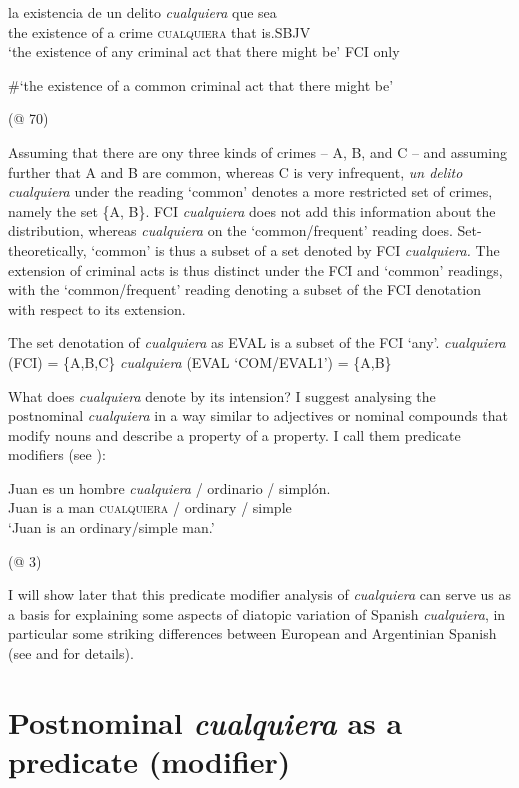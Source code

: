 {\ea \label{ex:key:143} %
\gll la existencia de un delito \textit{cualquiera} que sea\\
the existence of a crime \textsc{cualquiera} that is.\textsc{SBJV}\\
\glt ‘the existence of any criminal act that there might be’ FCI only

  \#‘the existence of a common criminal act that there might be’

  (@ 70)
\z

Assuming that there are ony three kinds of crimes -- A, B, and C -- and assuming further that A and B are common, whereas C is very infrequent, \textit{un delito cualquiera} under the reading ‘common’ denotes a more restricted set of crimes, namely the set \{A, B\}. FCI \textit{cualquiera} does not add this information about the distribution, whereas \textit{cualquiera} on the ‘common/frequent’ reading does. Set-theoretically, ‘common’ is thus a subset of a set denoted by FCI \textit{cualquiera.} The extension of criminal acts is thus distinct under the FCI and ‘common’ readings, with the ‘common/frequent’ reading denoting a subset of the FCI denotation with respect to its extension.

\ea \label{ex:key:144} %
The set denotation of \textit{cualquiera} as EVAL is a subset of the FCI ‘any’.
\ea \textit{cualquiera} (FCI) = \{A,B,C\}
\ex \textit{cualquiera} (EVAL ‘COM/EVAL1’) = \{A,B\}
\z
\z

What does \textit{cualquiera} denote by its intension? I suggest analysing the postnominal \textit{cualquiera} in a way similar to adjectives or nominal compounds that modify nouns and describe a property of a property. I call them predicate modifiers (see ):

\ea \label{ex:key:145} %
\gll Juan es un hombre \textit{cualquiera} / ordinario / simplón.\\
Juan is a man \textsc{cualquiera} / ordinary / simple\\
\glt ‘Juan is an ordinary/simple man.’

  (@ 3)
\z

I will show later that this predicate modifier analysis of \textit{cualquiera} can serve us as a basis for explaining some aspects of diatopic variation of Spanish \textit{cualquiera}, in particular some striking differences between European and Argentinian Spanish (see  and  for details).

\section{{Postnominal} {\textit{cualquiera}} {as} {a} {predicate} {(modifier)}} \label{sec:3.3}

}
